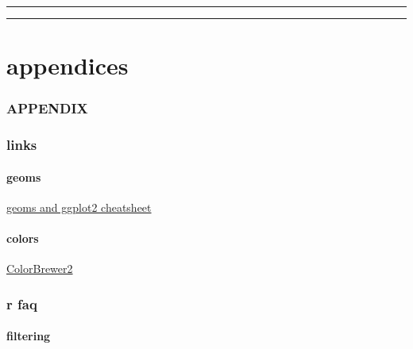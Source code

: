 \documentclass[
]{krantz}
\begin{document}
\begin{center}\rule{0.5\linewidth}{0.5pt}\end{center}

\begin{center}\rule{0.5\linewidth}{0.5pt}\end{center}

\hypertarget{part-appendices}{%
\part{appendices}\label{part-appendices}}

\hypertarget{section-1}{%
\section*{}\label{section-1}}

\hypertarget{appendix}{%
\section*{APPENDIX}\label{appendix}}

\hypertarget{links}{%
\section{links}\label{links}}

\hypertarget{geoms-1}{%
\subsection{geoms}\label{geoms-1}}

\href{https://thebustalab.github.io/R_For_Chemists_3/images/ggplot2_geoms.pdf}{geoms and ggplot2 cheatsheet}

\hypertarget{colors}{%
\subsection{colors}\label{colors}}

\href{https://colorbrewer2.org/}{ColorBrewer2}

\hypertarget{r-faq}{%
\section{r faq}\label{r-faq}}

\hypertarget{filtering}{%
\subsection{filtering}\label{filtering}}
\end{document}
